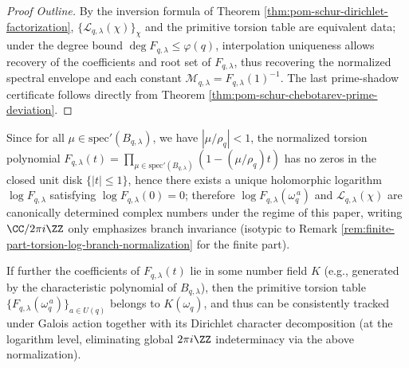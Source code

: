 \begin{proof}[Proof Outline]
By the inversion formula of Theorem \ref{thm:pom-schur-dirichlet-factorization}, \(\{\mathcal{L}_{q,\lambda}(\chi)\}_\chi\) and the primitive torsion table are equivalent data;
under the degree bound \(\deg F_{q,\lambda}\le\varphi(q)\), interpolation uniqueness allows recovery of the coefficients and root set of \(F_{q,\lambda}\), thus recovering the normalized spectral envelope and each constant \(\mathcal{M}_{q,\lambda}=F_{q,\lambda}(1)^{-1}\).
The last prime-shadow certificate follows directly from Theorem \ref{thm:pom-schur-chebotarev-prime-deviation}.
\end{proof}

\begin{remark}\label{rem:pom-schur-dirichlet-log-branch-normalization}
Since for all \(\mu\in\mathrm{spec}'(B_{q,\lambda})\), we have \(|\mu/\rho_q|<1\), the normalized torsion polynomial
\(
F_{q,\lambda}(t)=\prod_{\mu\in\mathrm{spec}'(B_{q,\lambda})}(1-(\mu/\rho_q)t)
\)
has no zeros in the closed unit disk \(\{|t|\le1\}\),
hence there exists a unique holomorphic logarithm \(\log F_{q,\lambda}\) satisfying \(\log F_{q,\lambda}(0)=0\);
therefore \(\log F_{q,\lambda}(\omega_q^{\,a})\) and \(\mathcal{L}_{q,\lambda}(\chi)\) are canonically determined complex numbers under the regime of this paper,
writing \(\CC/2\pi i\ZZ\) only emphasizes branch invariance (isotypic to Remark \ref{rem:finite-part-torsion-log-branch-normalization} for the finite part).
\par
If further the coefficients of \(F_{q,\lambda}(t)\) lie in some number field \(K\) (e.g., generated by the characteristic polynomial of \(B_{q,\lambda}\)), then the primitive torsion table
\(\{F_{q,\lambda}(\omega_q^{\,a})\}_{a\in U(q)}\) belongs to \(K(\omega_q)\),
and thus can be consistently tracked under Galois action together with its Dirichlet character decomposition (at the logarithm level, eliminating global \(2\pi i\ZZ\) indeterminacy via the above normalization).
\end{remark}


